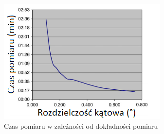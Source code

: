 \begin{figure}[H]
  \centering
  \includegraphics[scale=1]{lasertriangchart.PNG}
  \caption{Czas pomiaru w zależności od dokładności pomiaru \cite{el2008integrating}}   
  \label{fig:lasertriangchart}
\end{figure}